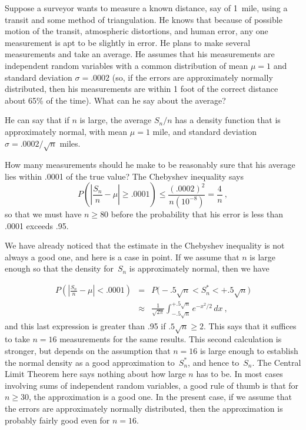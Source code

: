 \begin{example}\label{exam 9.10}
Suppose a surveyor wants to measure a known distance, say of 1~mile, using a
transit and some method of triangulation.  He knows that because of possible
motion of the transit, atmospheric distortions, and human error, any one
measurement is apt to be slightly in error.  He plans to make several
measurements and take an average.  He assumes that his measurements are
independent random variables with a common distribution of mean $\mu = 1$ and
standard deviation $\sigma = .0002$ (so, if the errors are approximately normally 
distributed, then his measurements are within 1 foot of the correct distance about
65\% of the time).  What can he say about the average?
\par
He can say that if $n$ is large, the average $S_n/n$ has a density function
that is approximately normal, with mean $\mu = 1$ mile, and standard deviation 
$\sigma = .0002/\sqrt n$ miles.

How many measurements should he make to be reasonably sure that his average
lies within .0001 of the true value?  The Chebyshev inequality says
$$
P\left(\left| \frac {S_n}n - \mu \right| \geq .0001 \right) \leq \frac
{(.0002)^2}{n(10^{-8})} = \frac 4n\ ,
$$
so that we must have $n \ge 80$ before the probability that his error is
less than .0001 exceeds .95.
\par
We have already noticed that the estimate in the Chebyshev inequality is not
always a good one, and here is a case in point.  If we assume that $n$ is large
enough so that the density for~$S_n$ is approximately normal, then we have
\par
\begin{eqnarray*}
P\left(\left| \frac {S_n}n - \mu \right| < .0001 \right) &=& P\bigl(-.5\sqrt{n} < S_n^*
< +.5\sqrt{n}\bigr) \\
     &\approx& \frac 1{\sqrt{2\pi}} \int_{-.5\sqrt{n}}^{+.5\sqrt{n}} e^{-x^2/2}\, dx\ ,
\end{eqnarray*}
and this last expression is greater than .95 if $.5\sqrt{n} \ge 2.$  This says that it 
suffices to take $n = 16$ measurements for the same results.  This second calculation is stronger,
but depends on the assumption that $n = 16$ is large enough to establish the normal 
density as a good approximation to~$S_n^*$, and hence to~$S_n$.  The Central Limit Theorem here 
says nothing about how large $n$ has to be.  In most cases involving sums of independent  
random variables, a good rule of thumb is that for $n \ge 30$, the approximation is a good
one.  In the present case, if we assume that the errors are approximately normally 
distributed, then the approximation is probably fairly good even for $n = 16$.
\end{example}

